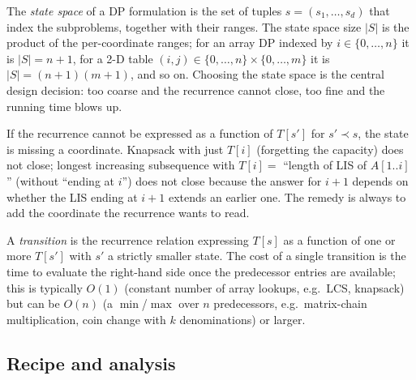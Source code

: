 \begin{definition}
\label{def:state_space}
The \emph{state space} of a DP formulation is the set of tuples $s = (s_1, \dots, s_d)$ that index the subproblems, together with their ranges. The state space size $|S|$ is the product of the per-coordinate ranges; for an array DP indexed by $i \in \{0, \dots, n\}$ it is $|S| = n+1$, for a 2-D table $(i, j) \in \{0, \dots, n\} \times \{0, \dots, m\}$ it is $|S| = (n+1)(m+1)$, and so on. Choosing the state space is the central design decision: too coarse and the recurrence cannot close, too fine and the running time blows up.
\end{definition}

\begin{remark}
If the recurrence cannot be expressed as a function of $T[s']$ for $s' \prec s$, the state is missing a coordinate. Knapsack with just $T[i]$ (forgetting the capacity) does not close; longest increasing subsequence with $T[i] = $ ``length of LIS of $A[1..i]$'' (without ``ending at $i$'') does not close because the answer for $i+1$ depends on whether the LIS ending at $i+1$ extends an earlier one. The remedy is always to add the coordinate the recurrence wants to read.
\end{remark}

\begin{definition}[Transition]
\label{def:transition}
A \emph{transition} is the recurrence relation expressing $T[s]$ as a function of one or more $T[s']$ with $s'$ a strictly smaller state. The cost of a single transition is the time to evaluate the right-hand side once the predecessor entries are available; this is typically $O(1)$ (constant number of array lookups, e.g.\ LCS, knapsack) but can be $O(n)$ (a $\min$/$\max$ over $n$ predecessors, e.g.\ matrix-chain multiplication, coin change with $k$ denominations) or larger.
\end{definition}

\subsection{Recipe and analysis}

